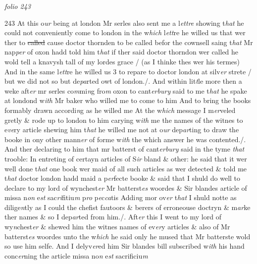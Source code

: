 \documentclass[12pt, a4paper]{book}
\begin{document}
\dotfill
					

\textit{folio 243}


{\color{Mahogany}243} At this o\textit{ur} being at london Mr serles also sent me a l\textit{ettre} showing t\textit{hat }he could not conveniently come to london in the w\textit{hich} l\textit{ett}re he willed us that wer ther to \sout{called }cause doctor thornden to be called befor 
				\marginpar[\vspace{0.5cm}{\textcolor{Gray}{Mr Napper}}]{}
			 the cownsell saing t\textit{hat} Mr nap\textit{per} of oxon hadd told him t\textit{hat} if ther said 
				\marginpar[\vspace{0.5cm}{\textcolor{Gray}{D. Thorden}}]{}
			 doctor thorndon wer called he wold tell a knavysh tall of my lordes grace / (as I thinke thes wer his termes) And in the same l\textit{ett}re he willed  us 3 to repare to doctor london at silv\textit{er} strete / but we did not so  but de\textit{pa}rted owt of london./.  And within lit\textit{t}le more then a weke aft\textit{er }mr serles co\textit{m}mi\textit{n}g fro\textit{m} oxon to cant\textit{erbury }said to me t\textit{hat} he spake at londond w\textit{ith} Mr baker who willed me to come  to him And to bring the books formably drawn accordi\textit{n}g as he willed me At the w\textit{hich} message I m\textit{er}veled gretly \& rode up to london to him carying w\textit{ith} me the names of the witnes to e\textit{ve}ry article shewing him t\textit{hat} he willed me not at o\textit{ur} dep\textit{ar}ting to draw the booke in ony other mann\textit{er} of forme w\textit{ith} the which answer he was contented./. And ther declaring to him that mr batterst of cant\textit{erbury} said in the tyme \textit{that} trooble: In entreting of certayn articles of S\textit{ir} bland \& other: he said that it wer well done t\textit{hat }one book wer maid of all such articles as wer detected \& told me t\textit{hat} doctor london hadd maid a p\textit{er}fecte booke \& said that I shuld do well to declare to my lord of wynchest\textit{er} Mr batterst\textit{es} woordes \& Sir blandes article of missa n\textit{on} e\textit{st} sac\textit{ri}fitiu\textit{m} p\textit{ro} p\textit{e}c\textit{ca}tis Addi\textit{n}g mor ov\textit{er} t\textit{hat }I shuld notte as dilige\textit{n}tly as I could  the chefist fautoors \& berers of erroneouse doctryn \& m\textit{ar}ke ther names \& so I dep\textit{ar}ted from him./.  Aft\textit{er} this I went to my lord of wy\textit{n}chest\textit{er} \& shewed him the witnes names of ev\textit{er}y articles \& also of Mr batterst\textit{es} woordes unto the w\textit{hich} he said only he mused that Mr batterste wold so use him selfe. And I delyv\textit{er}ed him Sir blandes bill subscribed w\textit{ith }his hand conc\textit{er}ning the article missa no\textit{n} e\textit{st} sacrificiu\textit{m}
\end{document}
